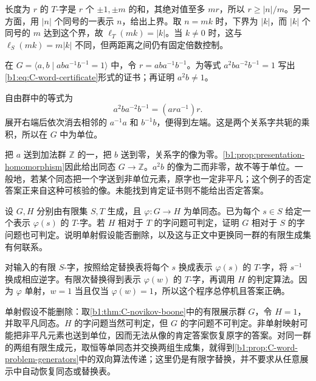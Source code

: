 \begin{solution}
	长度为 \(r\) 的 \(T\)-字是 \(r\) 个 \(\pm1,\pm m\) 的和，其绝对值至多 \(mr\)，所以 \(r\geq|n|/m\)。另一方面，用 \(|n|\) 个同号的一表示 \(n\)，给出上界。取 \(n=mk\) 时，下界为 \(|k|\)，而 \(|k|\) 个同号的 \(m\) 达到这个界，故 \(\ell_T(mk)=|k|\)。当 \(k\ne0\) 时，这与 \(\ell_S(mk)=m|k|\) 不同，但两距离之间仍有固定倍数控制。
\end{solution}

\begin{exercise}\label{b1:ex:C-word-finite-certificate}
	在 \(G=\langle a,b\mid aba^{-1}b^{-1}=1\rangle\) 中，令 \(r=aba^{-1}b^{-1}\)。为等式 \(a^2ba^{-2}b^{-1}=1\) 写出\eqref{b1:eq:C-word-certificate}形式的证书；再证明 \(a^2b\ne1\)。
\end{exercise}

\begin{solution}
	自由群中的等式为
	\[
		a^2ba^{-2}b^{-1}=(ara^{-1})r.
	\]
	展开右端后依次消去相邻的 \(a^{-1}a\) 和 \(b^{-1}b\)，便得到左端。这是两个关系字共轭的乘积，所以在 \(G\) 中为单位。

	把 \(a\) 送到加法群 \(\mathbb Z\) 的一，把 \(b\) 送到零，关系字的像为零。\cref{b1:prop:presentation-homomorphism}因此给出同态 \(G\rightarrow\mathbb Z\)。\(a^2b\) 的像为二而非零，故不等于单位。一般地，若某个同态把一个字送到非单位元素，原字也一定非平凡；这个例子的否定答案正来自这种可核验的像。未能找到肯定证书则不能给出否定答案。
\end{solution}

\begin{exercise}\label{b1:ex:C-two-semidecisions}
	设 \(G,H\) 分别由有限集 \(S,T\) 生成，且 \(\varphi:G\to H\) 为单同态。已为每个 \(s\in S\) 给定一个表示 \(\varphi(s)\) 的 \(T\)-字。若 \(H\) 相对于 \(T\) 的字问题可判定，证明 \(G\) 相对于 \(S\) 的字问题也可判定。说明单射假设能否删除，以及这与正文中更换同一群的有限生成集有何联系。
\end{exercise}

\begin{solution}
	对输入的有限 \(S\)-字，按照给定替换表将每个 \(s\) 换成表示 \(\varphi(s)\) 的 \(T\)-字，将 \(s^{-1}\) 换成相应逆字。有限次替换得到表示 \(\varphi(w)\) 的 \(T\)-字，再调用 \(H\) 的判定算法。因为 \(\varphi\) 单射，\(w=1\) 当且仅当 \(\varphi(w)=1\)，所以这个程序总停机且答案正确。

	单射假设不能删除：取\cref{b1:thm:C-novikov-boone}中的有限展示群 \(G\)，令 \(H=1\)，并取平凡同态。\(H\) 的字问题当然可判定，但 \(G\) 的字问题不可判定。非单射映射可能把非平凡元素也送到单位，因而无法从像的肯定答案恢复原字的答案。对同一群的两组有限生成元，取恒等单同态并交换两组生成集，就得到\cref{b1:prop:C-word-problem-generators}中的双向算法传递；这里仍是有限字替换，并不要求从任意展示中自动恢复同态或替换表。
\end{solution}

